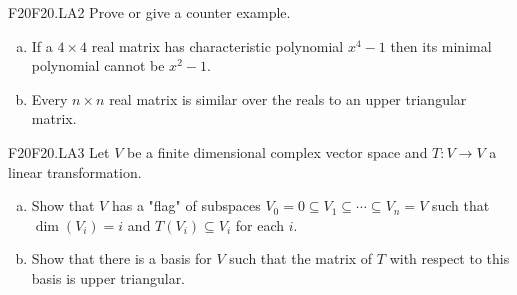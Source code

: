\documentclass{article}
\newcommand{\sq}{\subseteq}
\theoremstyle{definition}
\begin{document}
	\begin{prob}{F20}{F20.LA2}
	Prove or give a counter example.
	\begin{enumerate}[(a)]
	\item If a $4 \times 4$ real matrix has characteristic polynomial $x^4 -1$ then its minimal polynomial cannot be $x^2 - 1$.
	\item Every $n \times n$ real matrix is similar over the reals to an upper triangular matrix.
	\end{enumerate}
	\end{prob}
	
	\begin{prob}{F20}{F20.LA3}
	Let $V$ be a finite dimensional complex vector space and $T: V \to V$ a linear transformation.
	\begin{enumerate}[(a)]
	\item Show that $V$ has a "flag" of subspaces $V_0 = 0 \sq V_1 \sq \cdots \sq V_n = V$ such that $\dim(V_i) = i$ and $T(V_i) \sq V_i$ for each $i$.
	\item Show that there is a basis for $V$ such that the matrix of $T$ with respect to this basis is upper triangular.
	\end{enumerate}
	\end{prob}
	
\end{document}
